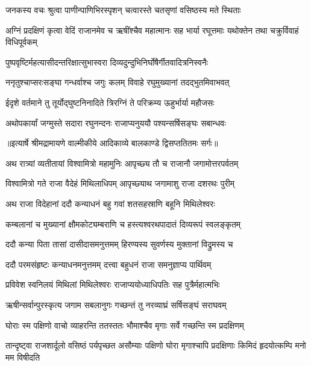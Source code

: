 \twolineshloka
{जनकस्य वचः श्रुत्वा पाणीन्पाणिभिरस्पृशन्}
{चत्वारस्ते चतसृणां वसिष्ठस्य मते स्थिताः} %

\threelineshloka
{अग्निं प्रदक्षिणं कृत्वा वेदिं राजानमेव च}
{ऋषींश्चैव महात्मानः सह भार्या रघूत्तमाः}
{यथोक्तेन तथा चक्रुर्विवाहं विधिपूर्वकम्} %

\twolineshloka
{पुष्पवृष्टिर्महत्यासीदन्तरिक्षात्सुभास्वरा}
{दिव्यदुन्दुभिनिर्घोषैर्गीतवादित्रनिस्वनैः} %

\twolineshloka
{ननृतुश्चाप्सरःसङ्घा गन्धर्वाश्च जगुः कलम्}
{विवाहे रघुमुख्यानां तदद्भुतमिवाभवत्} %

\twolineshloka
{ईदृशे वर्तमाने तु तूर्योद्घुष्टनिनादिते}
{त्रिरग्निं ते परिक्रम्य ऊहुर्भार्या महौजसः} %

\twolineshloka
{अथोपकार्यां जग्मुस्ते सदारा रघुनन्दनः}
{राजाप्यनुययौ पश्यन्सर्षिसङ्घः सबान्धवः} %


{॥इत्यार्षे श्रीमद्रामायणे वाल्मीकीये आदिकाव्ये बालकाण्डे द्विसप्ततितमः सर्गः॥}


\twolineshloka
{अथ रात्र्यां व्यतीतायां विश्वामित्रो महामुनिः}
{आपृच्छ्य तौ च राजानौ जगामोत्तरपर्वतम्} %

\twolineshloka
{विश्वामित्रो गते राजा वैदेहं मिथिलाधिपम्}
{आपृच्छ्याथ जगामाशु राजा दशरथः पुरीम्} %

\twolineshloka
{अथ राजा विदेहानां ददौ कन्याधनं बहु}
{गवां शतसहस्राणि बहूनि मिथिलेश्वरः} %

\twolineshloka
{कम्बलानां च मुख्यानां क्षौमकोट्यम्बराणि च}
{हस्त्यश्वरथपादातं दिव्यरूपं स्वलङ्कृतम्} %

\twolineshloka
{ददौ कन्या पिता तासां दासीदासमनुत्तमम्}
{हिरण्यस्य सुवर्णस्य मुक्तानां विद्रुमस्य च} %

\twolineshloka
{ददौ परमसंहृष्टः कन्याधनमनुत्तमम्}
{दत्त्वा बहुधनं राजा समनुज्ञाप्य पार्थिवम्} %

\twolineshloka
{प्रविवेश स्वनिलयं मिथिलां मिथिलेश्वरः}
{राजाप्ययोध्याधिपतिः सह पुत्रैर्महात्मभिः} %

\twolineshloka
{ऋषीन्सर्वान्पुरस्कृत्य जगाम सबलानुगः}
{गच्छन्तं तु नरव्याघ्रं सर्षिसङ्घं सराघवम्} %

\twolineshloka
{घोराः स्म पक्षिणो वाचो व्याहरन्ति ततस्ततः}
{भौमाश्चैव मृगाः सर्वे गच्छन्ति स्म प्रदक्षिणम्} %

\threelineshloka
{तान्दृष्ट्वा राजशार्दूलो वसिष्ठं पर्यपृच्छत}
{असौम्याः पक्षिणो घोरा मृगाश्चापि प्रदक्षिणाः}
{किमिदं हृदयोत्कम्पि मनो मम विषीदति} %

